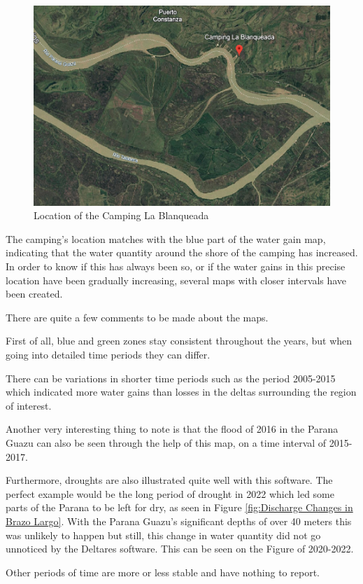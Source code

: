 \begin{figure}[H]
    \centering
    \includegraphics[width=0.5\linewidth]{figures/ch5/Camping Blanqueada.png}
    \caption{Location of the Camping La Blanqueada}
    \label{fig:Camping Blanqueada}
\end{figure}

The camping's location matches with the blue part of the water gain map, indicating that the water quantity around the shore of the camping has increased. 
In order to know if this has always been so, or if the water gains in this precise location have been gradually increasing, several maps with closer intervals have been created. 

There are quite a few comments to be made about the maps. 

First of all, blue and green zones stay consistent throughout the years, but when going into detailed time periods they can differ.

There can be variations in shorter time periods such as the period 2005-2015 which indicated more water gains than losses in the deltas surrounding the region of interest.

Another very interesting thing to note is that the flood of 2016 in the Parana Guazu can also be seen through the help of this map, on a time interval of 2015-2017.

Furthermore, droughts are also illustrated quite well with this software. The perfect example would be the long period of drought in 2022 which led some parts of the Parana to be left for dry, as seen in Figure \ref{fig:Discharge Changes in Brazo Largo}. With the Parana Guazu's significant depths of over 40 meters this was unlikely to happen but still, this change in water quantity did not go unnoticed by the Deltares software. This can be seen on the Figure of 2020-2022.

Other periods of time are more or less stable and have nothing to report.

